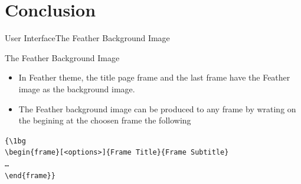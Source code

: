 \documentclass[10pt]{beamer}
\begin{document}
\section{Conclusion}
\begin{frame}{User Interface}{The Feather Background Image}

\begin{block}{The Feather Background Image}
    \begin{itemize}
    \item In Feather theme, the title page frame and the last frame have the Feather image as the background image. 
    \item The Feather background image can be produced to any frame by wrating on the begining at the choosen frame the following
    \end{itemize} 
    
    \vspace{5pt} 
    
  {\tt \{\textbackslash 1bg\\
    \textbackslash begin\{frame\}[<options>]\{Frame Title\}\{Frame Subtitle\}\\
    \ldots\\
    \textbackslash end\{frame\}\}}
\end{block}
\end{frame}

{\1
\begin{frame}
\end{frame}}
\end{document}
